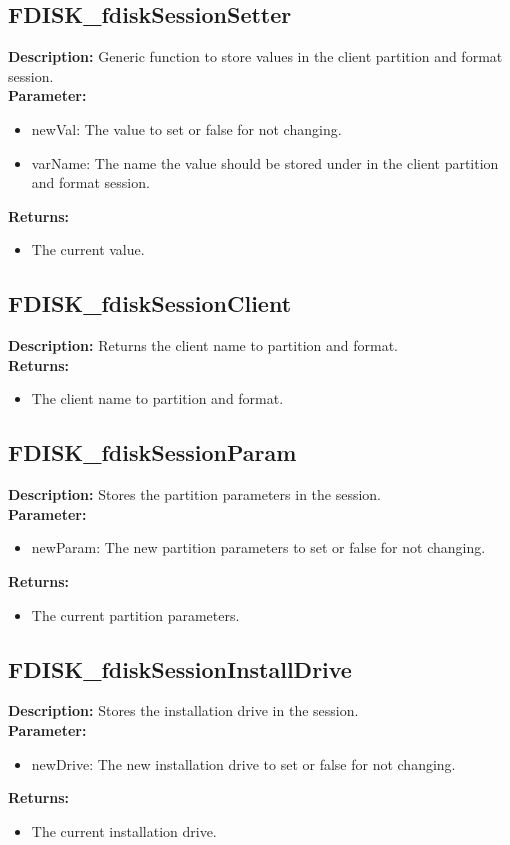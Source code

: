 \subsection{FDISK\_fdiskSessionSetter}
\textbf{Description:} Generic function to store values in the client partition and format session.\\
\textbf{Parameter:}
\begin{itemize}
\item newVal: The value to set or false for not changing.
\item varName: The name the value should be stored under in the client partition and format session.
\end{itemize}
\textbf{Returns:}
\begin{itemize}
\item The current value.
\end{itemize}

\subsection{FDISK\_fdiskSessionClient}
\textbf{Description:} Returns the client name to partition and format.\\
\textbf{Returns:}
\begin{itemize}
\item The client name to partition and format.
\end{itemize}

\subsection{FDISK\_fdiskSessionParam}
\textbf{Description:} Stores the partition parameters in the session.\\
\textbf{Parameter:}
\begin{itemize}
\item newParam: The new partition parameters to set or false for not changing.
\end{itemize}
\textbf{Returns:}
\begin{itemize}
\item The current partition parameters.
\end{itemize}

\subsection{FDISK\_fdiskSessionInstallDrive}
\textbf{Description:} Stores the installation drive in the session.\\
\textbf{Parameter:}
\begin{itemize}
\item newDrive: The new installation drive to set or false for not changing.
\end{itemize}
\textbf{Returns:}
\begin{itemize}
\item The current installation drive.
\end{itemize}

